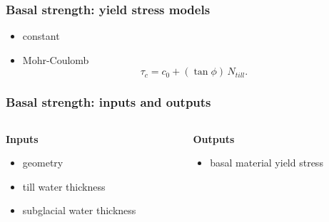 \documentclass[hide notes,intlimits]{beamer}
\begin{document}
\begin{frame}
  \frametitle{Basal strength: yield stress models}

  \begin{itemize}
  \item constant
  \item Mohr-Coulomb
    \begin{equation}
      \label{eq:12}
      \tau_c = c_{0} + (\tan\phi)\,N_{till}.
    \end{equation}
  \end{itemize}

\end{frame}

\begin{frame}
  \frametitle{Basal strength: inputs and outputs}

  \begin{columns}[t]
    \begin{column}{0.5\linewidth}
      \textbf{Inputs}

      \begin{itemize}
      \item geometry
      \item till water thickness
      \item subglacial water thickness
      \end{itemize}
    \end{column}
    \begin{column}{0.5\linewidth}
      \textbf{Outputs}

      \begin{itemize}
      \item basal material yield stress
      \end{itemize}
    \end{column}
  \end{columns}

\end{frame}
\end{document}
